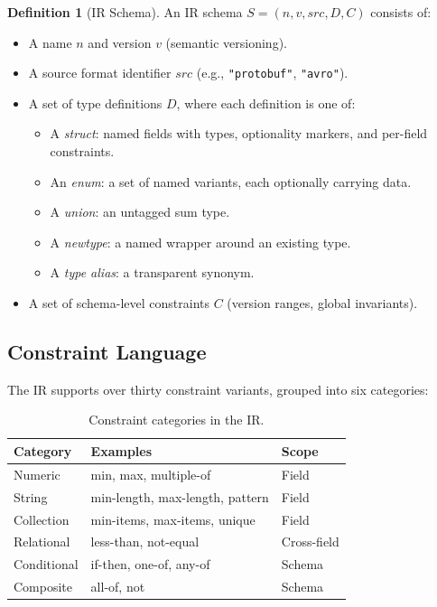 \documentclass[11pt,a4paper]{article}
\theoremstyle{definition}
\newtheorem{definition}[theorem]{Definition}
\theoremstyle{remark}
\begin{document}
\begin{definition}[IR Schema]\label{def:ir-schema}
An IR schema $S = (n, v, \mathit{src}, D, C)$ consists of:
\begin{itemize}
  \item A name $n$ and version $v$ (semantic versioning).
  \item A source format identifier $\mathit{src}$ (e.g.,
    \texttt{"protobuf"}, \texttt{"avro"}).
  \item A set of type definitions $D$, where each definition is one of:
    \begin{itemize}
      \item A \emph{struct}: named fields with types, optionality
        markers, and per-field constraints.
      \item An \emph{enum}: a set of named variants, each optionally
        carrying data.
      \item A \emph{union}: an untagged sum type.
      \item A \emph{newtype}: a named wrapper around an existing type.
      \item A \emph{type alias}: a transparent synonym.
    \end{itemize}
  \item A set of schema-level constraints $C$ (version ranges, global
    invariants).
\end{itemize}
\end{definition}

\subsection{Constraint Language}

The IR supports over thirty constraint variants, grouped into six
categories:

\begin{table}[ht]
\centering
\caption{Constraint categories in the IR.}
\label{tab:constraints}
\begin{tabular}{@{}lll@{}}
\toprule
\textbf{Category} & \textbf{Examples} & \textbf{Scope} \\
\midrule
Numeric & min, max, multiple-of & Field \\
String  & min-length, max-length, pattern & Field \\
Collection & min-items, max-items, unique & Field \\
Relational & less-than, not-equal & Cross-field \\
Conditional & if-then, one-of, any-of & Schema \\
Composite  & all-of, not & Schema \\
\bottomrule
\end{tabular}
\end{table}
\end{document}
